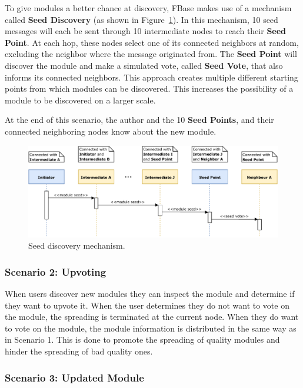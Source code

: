 To give modules a better chance at discovery, FBase makes use of a mechanism called \textbf{Seed Discovery} (as shown in Figure~\ref{fig:seed-discovery}). In this mechanism, 10 seed messages will each be sent through 10 intermediate nodes to reach their \textbf{Seed Point}. At each hop, these nodes select one of its connected neighbors at random, excluding the neighbor where the message originated from. The \textbf{Seed Point} will discover the module and make a simulated vote, called \textbf{Seed Vote}, that also informs its connected neighbors. This approach creates multiple different starting points from which modules can be discovered. This increases the possibility of a module to be discovered on a larger scale.

At the end of this scenario, the author and the 10 \textbf{Seed Points}, and their connected neighboring nodes know about the new module.

\begin{figure}[h]
	\centering
	\includegraphics[width=1\textwidth]{images/design-discovery-protocol-seed.pdf}
	\caption{\label{fig:seed-discovery} Seed discovery mechanism.}
\end{figure}

\newpage

\subsubsection{\textbf{Scenario 2: Upvoting}}

When users discover new modules they can inspect the module and determine if they want to upvote it. When the user determines they do not want to vote on the module, the spreading is terminated at the current node. When they do want to vote on the module, the module information is distributed in the same way as in Scenario 1. This is done to promote the spreading of quality modules and hinder the spreading of bad quality ones. 

\subsubsection{\textbf{Scenario 3: Updated Module}}

